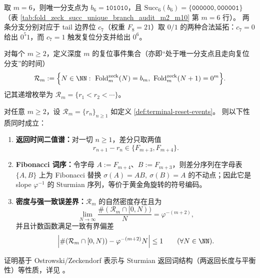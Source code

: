 \begin{enumerate}
  \begin{remark}\label{rem:terminal-succ-m6-specialization}
  取 \(m=6\)，则唯一分支点为 \(b_6=\texttt{101010}\)，且
  \(\mathrm{Succ}_6(b_6)=\{\texttt{000000},\texttt{000001}\}\)（表 \ref{tab:fold_zeck_succ_unique_branch_audit_m2_m10} 第 \(m=6\) 行）。
  两条分支分别对应于 tail 边界位 \(c_7\)（权重 \(F_8=21\)）取 \(0/1\) 的两种合法延拓：\(c_7=0\) 给出 \(0^{5}1\)，而 \(c_7=1\) 触发复位分支并给出 \(0^6\)。
  \end{remark}

  \begin{definition}[复位事件集合]\label{def:terminal-reset-events}
  对每个 \(m\ge 2\)，定义深度 \(m\) 的复位事件集合（亦即“处于唯一分支点且走向复位分支”的时间）
  \[
  \mathcal R_m
  :=\Bigl\{
  N\in\NN:\ \mathrm{Fold}^{\mathrm{zeck}}_m(N)=b_m,\ \mathrm{Fold}^{\mathrm{zeck}}_m(N+1)=0^m
  \Bigr\}.
  \]
  记其递增枚举为 \(\mathcal R_m=\{r_1<r_2<\cdots\}\)。
  \end{definition}

  \begin{theorem}\label{thm:terminal-reset-events-sturmian}
  对任意 \(m\ge 2\)，设 \(\mathcal R_m=\{r_n\}_{n\ge 1}\) 如定义 \ref{def:terminal-reset-events}。
  则以下性质同时成立：
  \begin{enumerate}
    \item \textbf{返回时间二值谱：}对一切 \(n\ge 1\)，差分只取两值
    \[
    r_{n+1}-r_n\in\{F_{m+3},F_{m+4}\}.
    \]
    \item \textbf{Fibonacci 词序：}令字母 \(A:=F_{m+4}\)、\(B:=F_{m+3}\)，则差分序列在字母表 \(\{A,B\}\) 上为 Fibonacci 替换 \(\sigma(A)=AB,\ \sigma(B)=A\) 的不动点；因此它是 slope \(\varphi^{-1}\) 的 Sturmian 序列，等价于黄金角旋转的符号编码。
    \item \textbf{密度与强一致误差界：}\(\mathcal R_m\) 的自然密度存在且为
    \[
    \lim_{N\to\infty}\frac{\#(\mathcal R_m\cap[0,N))}{N}=\varphi^{-(m+2)},
    \]
    并且计数函数满足一致有界偏差
    \[
    \Bigl|\#(\mathcal R_m\cap[0,N))-\varphi^{-(m+2)}N\Bigr|\le 1\qquad(\forall N\in\NN).
    \]
  \end{enumerate}
  证明基于 Ostrowski/Zeckendorf 表示与 Sturmian 返回词结构（两返回长度与平衡性）等性质，详见 \cite{MorseHedlund1940,LindMarcus1995,Slater1950DistributionIntegers,Slater1967GapsSteps}。
  \end{theorem}
  
  


\end{enumerate}
